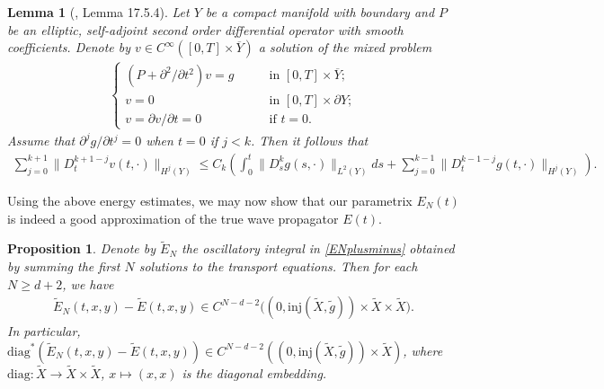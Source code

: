 \documentclass[11pt,letterpaper,oneside]{amsart}
\newcommand{\inj}{\text{inj}}
\newtheorem{prop}[theo]{Proposition}
\newtheorem{lemm}[theo]{Lemma}
\theoremstyle{definition}
\theoremstyle{remark}
\newcommand{\wt}{\widetilde}
\theoremstyle{definition}
\theoremstyle{remark}
\begin{document}
\begin{lemm}[\cite{Ho385}, Lemma 17.5.4]\label{Energy}
    Let $Y$ be a compact manifold with boundary and $P$ be an elliptic, self-adjoint second order differential operator with smooth coefficients. Denote by  \( v \in C^\infty([0,T] \times \overline{Y}) \) a solution of the mixed problem
    \begin{align} \label{eq: Hormander energy estimates}
        \begin{cases}
            (P + \partial^2 / \partial t^2)v = g & \qquad\text{in } [0,T] \times \overline{Y}; \\
            v = 0 & \qquad\text{in } [0,T] \times \partial Y; \\
            v = \partial v / \partial t = 0 & \qquad \text{if } t = 0.
        \end{cases}	
    \end{align}
    Assume that \( \partial^j g / \partial t^j = 0 \) when \( t = 0 \) if \( j < k \). Then it follows that
    \begin{align*}
        \sum_{j = 0}^{k+1} \| D_t^{k+1-j} v(t, \cdot) \|_{H^j(Y)} \leq C_k \left( \int_{0}^{t} \| D_s^k g(s, \cdot) \|_{L^2(Y)} ds + \sum_{j=0}^{k-1} \| D_t^{k-1-j} g(t, \cdot) \|_{H^j(Y)} \right).
    \end{align*}
\end{lemm}

Using the above energy estimates, we may now show that our parametrix $E_N(t)$ is indeed a good approximation of the true wave propagator $E(t)$.
\begin{prop}\label{Cr approximation}
    Denote by $\wt E_N$ the oscillatory integral in \eqref{ENplusminus} obtained by summing the first $N$ solutions to the transport equations. Then for each $N \geq d + 2$, we have
    \begin{align*}
        \wt E_N(t,x,y) - \wt E(t,x,y) \in C^{N - d - 2}\big((0, \inj(\wt X, \wt g) )\times \wt X \times \wt X\big).
    \end{align*}
    In particular, $\text{diag}^*\left(\wt E_N(t,x,y) - \wt E(t,x,y) \right) \in C^{N - d - 2}((0, \inj(\wt X, \wt g) ) \times \wt X)$, where $\text{diag}: \wt X \to \wt X \times \wt X$, $x \mapsto (x,x)$ is the diagonal embedding.
\end{prop}
		
\end{document}
